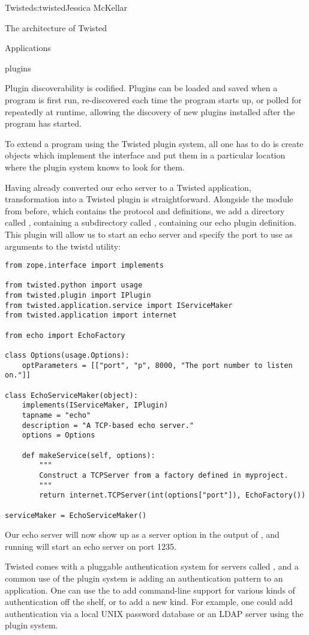 \begin{aosachapter}{Twisted}{s:twisted}{Jessica McKellar}
\begin{aosasect1}{The architecture of Twisted}
\begin{aosasect2}{Applications}
\begin{aosasect3}{plugins}
\begin{aosaenumerate}
\item Plugin discoverability is codified. Plugins can be loaded and
  saved when a program is first run, re-discovered each time the
  program starts up, or polled for repeatedly at runtime, allowing the
  discovery of new plugins installed after the program has started.

\end{aosaenumerate}

To extend a program using the Twisted plugin system, all one has to do is
create objects which implement the  interface and put them
in a particular location where the plugin system knows to look for them.

Having already converted our echo server to a Twisted application,
transformation into a Twisted plugin is straightforward. Alongside the
 module from before, which contains the 
protocol and  definitions, we add a directory called
, containing a subdirectory called ,
containing our echo plugin definition. This plugin will allow us to start an
echo server and specify the port to use as arguments to the twistd utility:

\begin{verbatim}
from zope.interface import implements

from twisted.python import usage
from twisted.plugin import IPlugin
from twisted.application.service import IServiceMaker
from twisted.application import internet

from echo import EchoFactory

class Options(usage.Options):
    optParameters = [["port", "p", 8000, "The port number to listen on."]]

class EchoServiceMaker(object):
    implements(IServiceMaker, IPlugin)
    tapname = "echo"
    description = "A TCP-based echo server."
    options = Options

    def makeService(self, options):
        """
        Construct a TCPServer from a factory defined in myproject.
        """
        return internet.TCPServer(int(options["port"]), EchoFactory())

serviceMaker = EchoServiceMaker()
\end{verbatim}

Our echo server will now show up as a server option in the output of
, and running 
will start an echo server on port 1235.

Twisted comes with a pluggable authentication system for servers called
, and a common use of the plugin system is adding an
authentication pattern to an application. One can use the  to add command-line support for various kinds of
authentication off the shelf, or to add a new kind. For example, one could add
authentication via a local UNIX password database or an LDAP server using the
plugin system.


\end{aosasect3}
\end{aosasect2}
\end{aosasect1}
\end{aosachapter}
